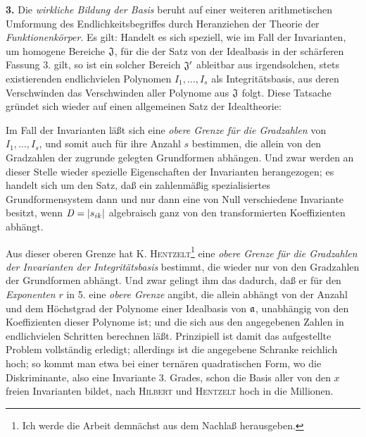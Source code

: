 \textbf{3.} Die \emph{wirkliche Bildung der Basis} beruht auf einer weiteren arithmetischen Umformung des Endlichkeitsbegriffes durch Heranziehen der Theorie der \emph{Funktionenkörper}. Es gilt:
Handelt es sich speziell, wie im Fall der Invarianten, um homogene Bereiche $\mathfrak J$, für die der Satz von der Idealbasis in der schärferen Fassung 3. gilt, so ist ein solcher Bereich $\mathfrak J'$ ableitbar aus irgendsolchen, stets existierenden endlichvielen Polynomen $I_1,\ldots,I_s$ als Integritätsbasis, aus deren Verschwinden das Verschwinden aller Polynome aus $\mathfrak J$ folgt. Diese Tatsache gründet sich wieder auf einen allgemeinen Satz der Idealtheorie:

Im Fall der Invarianten läßt sich eine \emph{obere Grenze für die Gradzahlen} von $I_1,\ldots,I_s$, und somit auch für ihre Anzahl $s$ bestimmen, die allein von den Gradzahlen der zugrunde gelegten Grundformen abhängen. Und zwar werden an dieser Stelle wieder spezielle Eigenschaften der Invarianten herangezogen; es handelt sich um den Satz, daß ein zahlenmäßig spezialisiertes Grundformensystem dann und nur dann eine von Null verschiedene Invariante besitzt, wenn $\mathit D=|s_{ik}|$ algebraisch ganz von den transformierten Koeffizienten abhängt.

Aus dieser oberen Grenze hat K. \textsc{Hentzelt}\footnote{Ich werde die Arbeit demnächst aus dem Nachlaß herausgeben.} eine \emph{obere Grenze für die Gradzahlen der Invarianten der Integritätsbasis} bestimmt, die wieder nur von den Gradzahlen der Grundformen abhängt. Und zwar gelingt ihm das dadurch, daß er für den \emph{Exponenten} $r$ in 5. eine \emph{obere Grenze} angibt, die allein abhängt von der Anzahl und dem Höchstgrad der Polynome einer Idealbasis von $\mathfrak a$, unabhängig von den Koeffizienten dieser Polynome ist; und die sich aus den angegebenen Zahlen in endlichvielen Schritten berechnen läßt. Prinzipiell ist damit das aufgestellte Problem vollständig erledigt; allerdings ist die angegebene Schranke reichlich hoch; so kommt man etwa bei einer ternären quadratischen Form, wo die Diskriminante, also eine Invariante 3. Grades, schon die Basis aller von den $x$ freien Invarianten bildet, nach \textsc{Hilbert} und \textsc{Hentzelt} hoch in die Millionen.

